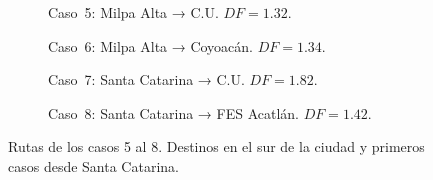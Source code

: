 \begin{figure}[H]
    \centering
    \begin{subfigure}[t]{0.48\textwidth}
        \caption{Caso~5: Milpa Alta → C.U. $DF = 1.32$.}
        \label{fig:df-c05}
    \end{subfigure}
    \hfill
    \begin{subfigure}[t]{0.48\textwidth}
        \caption{Caso~6: Milpa Alta → Coyoacán. $DF = 1.34$.}
        \label{fig:df-c06}
    \end{subfigure}

    \vspace{0.5em}
    \begin{subfigure}[t]{0.48\textwidth}
        \caption{Caso~7: Santa Catarina → C.U. $DF = 1.82$.}
        \label{fig:df-c07}
    \end{subfigure}
    \hfill
    \begin{subfigure}[t]{0.48\textwidth}
        \caption{Caso~8: Santa Catarina → FES Acatlán. $DF = 1.42$.}
        \label{fig:df-c08}
    \end{subfigure}
    \caption[Casos de estudio del Factor de Desviación: 5–8]{Rutas de los casos 5 al 8.
    Destinos en el sur de la ciudad y primeros casos desde Santa Catarina.}
    \label{fig:df-casos-5-8}
\end{figure}

